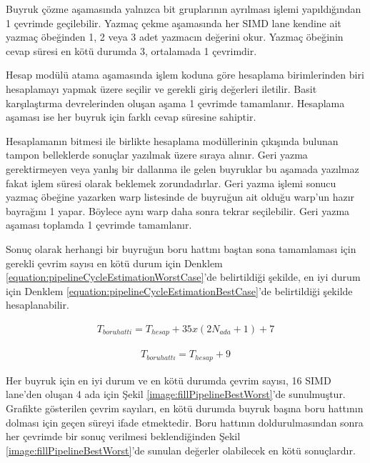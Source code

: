 Buyruk çözme aşamasında yalnızca bit gruplarının ayrılması işlemi yapıldığından 1 çevrimde geçilebilir. Yazmaç çekme aşamasında her SIMD lane kendine ait yazmaç öbeğinden 1, 2 veya 3 adet yazmacın değerini okur. Yazmaç öbeğinin cevap süresi en kötü durumda 3, ortalamada 1 çevrimdir.\par
Hesap modülü atama aşamasında işlem koduna göre hesaplama birimlerinden biri hesaplamayı yapmak üzere seçilir ve gerekli giriş değerleri iletilir. Basit karşılaştırma devrelerinden oluşan aşama 1 çevrimde tamamlanır. Hesaplama aşaması ise her buyruk için farklı cevap süresine sahiptir. \par
Hesaplamanın bitmesi ile birlikte hesaplama modüllerinin çıkışında bulunan tampon belleklerde sonuçlar yazılmak üzere sıraya alınır. Geri yazma gerektirmeyen veya yanlış bir dallanma ile gelen buyruklar bu aşamada yazılmaz fakat işlem süresi olarak beklemek zorundadırlar. Geri yazma işlemi sonucu yazmaç öbeğine yazarken warp listesinde de buyruğun ait olduğu warp'un hazır bayrağını 1 yapar. Böylece aynı warp daha sonra tekrar seçilebilir. Geri yazma aşaması toplamda 1 çevrimde tamamlanır.\par

Sonuç olarak herhangi bir buyruğun boru hattını baştan sona tamamlaması için gerekli çevrim sayısı en kötü durum için Denklem \ref{equation:pipelineCycleEstimationWorstCase}'de belirtildiği şekilde, en iyi durum için Denklem \ref{equation:pipelineCycleEstimationBestCase}'de belirtildiği şekilde hesaplanabilir.\par

\begin{align} \label{equation:pipelineCycleEstimationWorstCase}
	T_{boru hatti} 	= T_{hesap} + 35 x (2N_{ada}+1) + 7
\end{align}

\begin{align} \label{equation:pipelineCycleEstimationBestCase}
	T_{boru hattı}  =  T_{hesap} + 9
\end{align}

Her buyruk için en iyi durum ve en kötü durumda çevrim sayısı, 16 SIMD lane'den oluşan 4 ada için Şekil \ref{image:fillPipelineBestWorst}'de sunulmuştur. Grafikte gösterilen çevrim sayıları, en kötü durumda buyruk başına boru hattının dolması için geçen süreyi ifade etmektedir. Boru hattının doldurulmasından sonra her çevrimde bir sonuç verilmesi beklendiğinden Şekil \ref{image:fillPipelineBestWorst}'de sunulan değerler olabilecek en kötü sonuçlardır.\par

